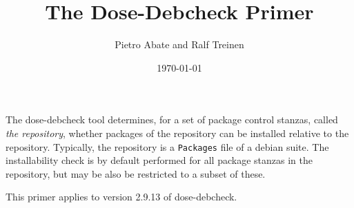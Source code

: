 \documentclass{article}
\title{The Dose-Debcheck Primer}
\author{Pietro Abate and Ralf Treinen}
\date{\today}
\newcommand{\debcheck}{dose-debcheck}
\begin{document}
\maketitle

The \debcheck{} tool determines, for a set of package control stanzas,
called \emph{the repository}, whether packages of the repository can
be installed relative to the repository. Typically, the repository is
a \texttt{Packages} file of a debian suite. The installability check
is by default performed for all package stanzas in the repository, but
may be also be restricted to a subset of these.

This primer applies to version 2.9.13 of \debcheck. 

\tableofcontents












\end{document}
